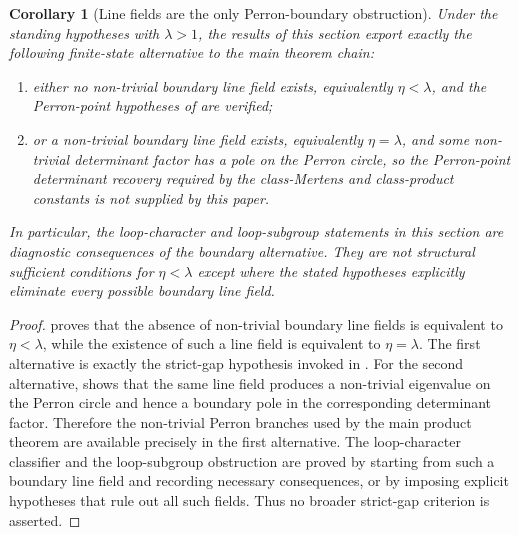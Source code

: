 \documentclass[11pt,a4paper]{amsart}
\theoremstyle{plain}
\newtheorem{corollary}[theorem]{Corollary}
\theoremstyle{definition}
\theoremstyle{remark}
\begin{document}
\begin{corollary}[Line fields are the only Perron-boundary obstruction]
  \label{cor:eta-gap-only-boundary-export}
  Under the standing hypotheses with \(\lambda>1\), the results of this
  section export exactly the following finite-state alternative to the main
  theorem chain:
  \begin{enumerate}[label=\textup{(\roman*)},leftmargin=*]
    \item either no non-trivial boundary line field exists, equivalently
      \(\eta<\lambda\), and the Perron-point hypotheses of
       are
      verified;
    \item or a non-trivial boundary line field exists, equivalently
      \(\eta=\lambda\), and some non-trivial determinant factor has a pole on
      the Perron circle, so the Perron-point determinant recovery required by
      the class-Mertens and class-product constants is not supplied by this
      paper.
  \end{enumerate}
  In particular, the loop-character and loop-subgroup statements in this
  section are diagnostic consequences of the boundary alternative.  They are
  not structural sufficient conditions for \(\eta<\lambda\) except where the
  stated hypotheses explicitly eliminate every possible boundary line field.
\end{corollary}

\begin{proof}
   proves that the absence of
  non-trivial boundary line fields is equivalent to \(\eta<\lambda\), while
  the existence of such a line field is equivalent to \(\eta=\lambda\).  The
  first alternative is exactly the strict-gap hypothesis invoked in
  .  For the
  second alternative,  shows that the same
  line field produces a non-trivial eigenvalue on the Perron circle and hence
  a boundary pole in the corresponding determinant factor.  Therefore the
  non-trivial Perron branches used by the main product theorem are available
  precisely in the first alternative.  The loop-character classifier and the
  loop-subgroup obstruction are proved by starting from such a boundary line
  field and recording necessary consequences, or by imposing explicit
  hypotheses that rule out all such fields.  Thus no broader strict-gap
  criterion is asserted.
\end{proof}
\end{document}
